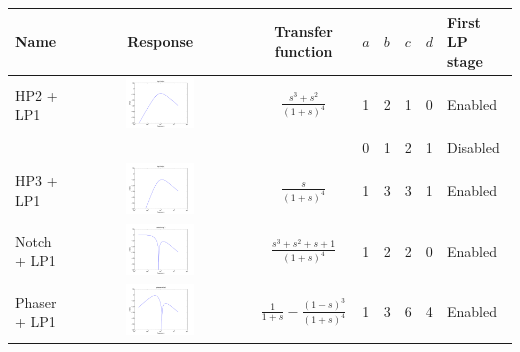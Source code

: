 \documentclass[a4paper,10pt]{article}
\begin{document}
\begin{tabular}{lcclllll}
\hline
Name & Response & Transfer function & $a$ & $b$ & $c$ & $d$ & First LP stage \\
\hline
HP2 + LP1 & \includegraphics[width=0.4\textwidth]{response_hp2_lp1.pdf} & $\frac{s^3 + s^2}{(1 + s)^4}$ & 1 & 2 & 1 & 0 & Enabled \\
 & & & 0 & 1 & 2 & 1 & Disabled \\
\hline
HP3 + LP1 & \includegraphics[width=0.4\textwidth]{response_hp3_lp1.pdf} & $\frac{s}{(1 + s)^4}$ & 1 & 3 & 3 & 1 & Enabled \\
\hline
Notch + LP1 & \includegraphics[width=0.4\textwidth]{response_notch_lp1.pdf} & $\frac{s^3 + s^2 + s + 1}{(1 + s)^4}$ & 1 & 2 & 2 & 0 & Enabled \\
\hline
Phaser + LP1 & \includegraphics[width=0.4\textwidth]{response_phaser_lp1.pdf} & $\frac{1}{1 + s} - \frac{(1 - s)^3}{(1 + s)^4}$ & 1 & 3 & 6 & 4 & Enabled \\
\hline
\end{tabular}
\end{document}
